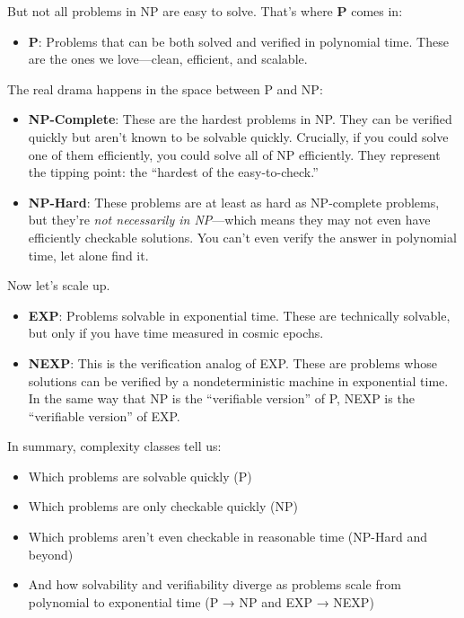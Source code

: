 But not all problems in NP are easy to solve. That's where \textbf{P} comes in:

\begin{itemize}
  \item \textbf{P}: Problems that can be both solved and verified in polynomial time. These are the ones we love—clean, efficient, and scalable.
\end{itemize}

The real drama happens in the space between P and NP:

\begin{itemize}
  \item \textbf{NP-Complete}: These are the hardest problems in NP. They can be verified quickly but aren’t known to be solvable quickly. Crucially, if you could solve one of them efficiently, you could solve all of NP efficiently. They represent the tipping point: the “hardest of the easy-to-check.”
  \item \textbf{NP-Hard}: These problems are at least as hard as NP-complete problems, but they’re \emph{not necessarily in NP}—which means they may not even have efficiently checkable solutions. You can’t even verify the answer in polynomial time, let alone find it.
\end{itemize}

Now let’s scale up.

\begin{itemize}
  \item \textbf{EXP}: Problems solvable in exponential time. These are technically solvable, but only if you have time measured in cosmic epochs.
  \item \textbf{NEXP}: This is the verification analog of EXP. These are problems whose solutions can be verified by a nondeterministic machine in exponential time. In the same way that NP is the “verifiable version” of P, NEXP is the “verifiable version” of EXP.
\end{itemize}

\medskip

\noindent In summary, complexity classes tell us:

\begin{itemize}
  \item Which problems are solvable quickly (P)
  \item Which problems are only checkable quickly (NP)
  \item Which problems aren’t even checkable in reasonable time (NP-Hard and beyond)
  \item And how solvability and verifiability diverge as problems scale from polynomial to exponential time (P → NP and EXP → NEXP)
\end{itemize}

